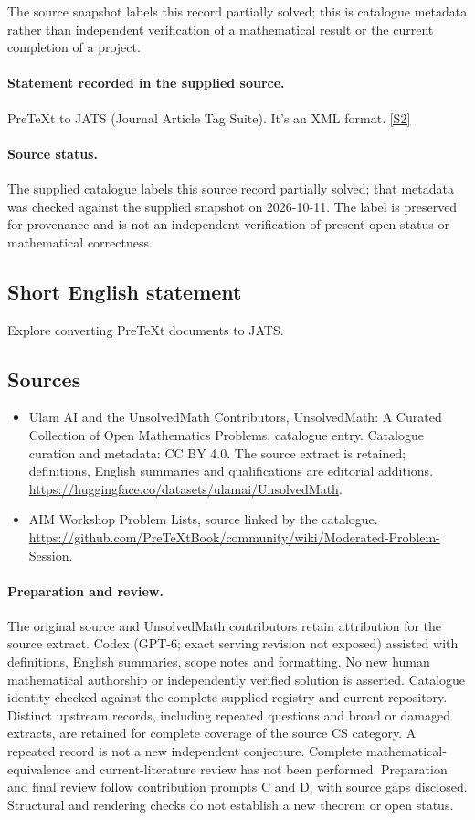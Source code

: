 \documentclass[11pt]{article}
\begin{document}
The source snapshot labels this record partially solved; this is catalogue metadata rather than independent verification of a mathematical result or the current completion of a project.
\paragraph{Statement recorded in the supplied source.}
PreTeXt to JATS (Journal Article Tag Suite). It's an XML format. \href{https://github.com/PreTeXtBook/community/wiki/Moderated-Problem-Session}{[S2]}
\paragraph{Source status.}
The supplied catalogue labels this source record partially solved; that metadata was checked against the supplied snapshot on 2026-10-11. The label is preserved for provenance and is not an independent verification of present open status or mathematical correctness.
\subsection{Short English statement}
Explore converting PreTeXt documents to JATS.
\subsection{Sources}
\begin{itemize}
\item[S1] Ulam AI and the UnsolvedMath Contributors, UnsolvedMath: A Curated Collection of Open Mathematics Problems, catalogue entry. Catalogue curation and metadata: CC BY 4.0. The source extract is retained; definitions, English summaries and qualifications are editorial additions.
\url{https://huggingface.co/datasets/ulamai/UnsolvedMath}.
\item[S2] AIM Workshop Problem Lists, source linked by the catalogue.
\url{https://github.com/PreTeXtBook/community/wiki/Moderated-Problem-Session}.
\end{itemize}
\paragraph{Preparation and review.}
The original source and UnsolvedMath contributors retain attribution for the source extract. Codex (GPT-6; exact serving revision not exposed) assisted with definitions, English summaries, scope notes and formatting. No new human mathematical authorship or independently verified solution is asserted. Catalogue identity checked against the complete supplied registry and current repository. Distinct upstream records, including repeated questions and broad or damaged extracts, are retained for complete coverage of the source CS category. A repeated record is not a new independent conjecture. Complete mathematical-equivalence and current-literature review has not been performed. Preparation and final review follow contribution prompts C and D, with source gaps disclosed. Structural and rendering checks do not establish a new theorem or open status.
\label{end:statement}
\end{document}
